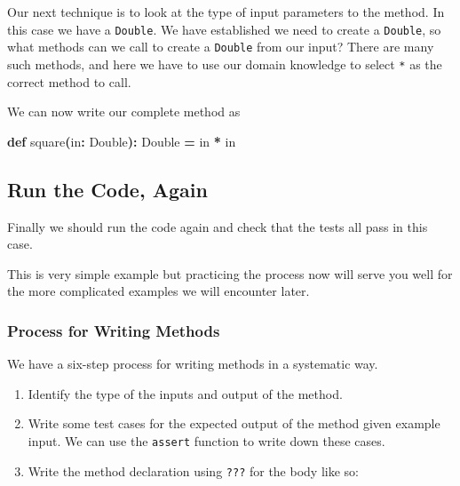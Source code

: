 \documentclass[11pt,a5paper,]{book}
\newenvironment{Shaded}{\begin{snugshade}}{\end{snugshade}}
\newcommand{\ExtensionTok}[1]{#1}
\newcommand{\FunctionTok}[1]{\textcolor[rgb]{0.00,0.00,0.00}{#1}}
\newcommand{\KeywordTok}[1]{\textcolor[rgb]{0.13,0.29,0.53}{\textbf{#1}}}
\newcommand{\NormalTok}[1]{#1}
\newcommand{\OperatorTok}[1]{\textcolor[rgb]{0.81,0.36,0.00}{\textbf{#1}}}
\providecommand{\tightlist}{%
  \setlength{\itemsep}{0pt}\setlength{\parskip}{0pt}}
\begin{document}
Our next technique is to look at the type of input parameters to the
method. In this case we have a \texttt{Double}. We have established we
need to create a \texttt{Double}, so what methods can we call to create
a \texttt{Double} from our input? There are many such methods, and here
we have to use our domain knowledge to select \texttt{*} as the correct
method to call.

We can now write our complete method as

\begin{Shaded}
\begin{Highlighting}[]
\KeywordTok{def} \FunctionTok{square}\OperatorTok{(}\NormalTok{in}\OperatorTok{:} \ExtensionTok{Double}\OperatorTok{):} \ExtensionTok{Double} \OperatorTok{=}
\NormalTok{  in }\OperatorTok{*}\NormalTok{ in}
\end{Highlighting}
\end{Shaded}

\hypertarget{run-the-code-again}{%
\subsection{Run the Code, Again}\label{run-the-code-again}}

Finally we should run the code again and check that the tests all pass
in this case.

This is very simple example but practicing the process now will serve
you well for the more complicated examples we will encounter later.

\hypertarget{process-for-writing-methods}{%
\subsubsection*{Process for Writing
Methods}\label{process-for-writing-methods}}

We have a six-step process for writing methods in a systematic way.

\begin{enumerate}
\def\labelenumi{\arabic{enumi}.}
\tightlist
\item
  Identify the type of the inputs and output of the method.
\item
  Write some test cases for the expected output of the method given
  example input. We can use the \texttt{assert} function to write down
  these cases.
\item
  Write the method declaration using \texttt{???} for the body like so:
\end{enumerate}
\end{document}
